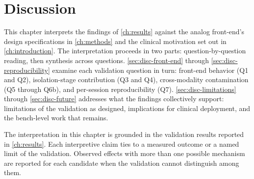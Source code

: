 

\chapter{Discussion}
\label{ch:discussion}


This chapter interprets the findings of \autoref{ch:results} against the analog front-end's design specifications in \autoref{ch:methods} and the clinical motivation set out in \autoref{ch:introduction}. The interpretation proceeds in two parts: question-by-question reading, then synthesis across questions. \autoref{sec:disc-front-end} through \autoref{sec:disc-reproducibility} examine each validation question in turn: front-end behavior (Q1 and Q2), isolation-stage contribution (Q3 and Q4), cross-modality contamination (Q5 through Q6b), and per-session reproducibility (Q7). \autoref{sec:disc-limitations} through \autoref{sec:disc-future} addresses what the findings collectively support: limitations of the validation as designed, implications for clinical deployment, and the bench-level work that remains.

The interpretation in this chapter is grounded in the validation results reported in \autoref{ch:results}. Each interpretive claim ties to a measured outcome or a named limit of the validation. Observed effects with more than one possible mechanism are reported for each candidate when the validation cannot distinguish among them.

%
%
%

